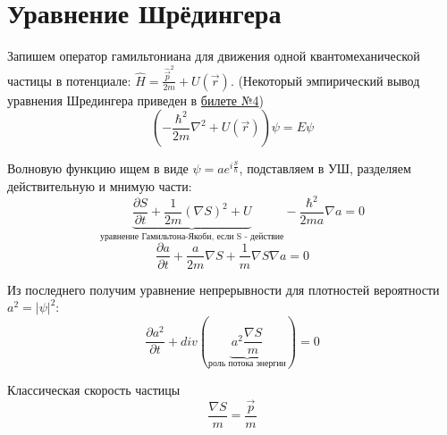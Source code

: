 \newpage
\chapter{Уравнение Шрёдингера}
\par Запишем оператор гамильтониана для движения одной квантомеханической частицы в потенциале: $\hat{H} =\frac{\hat{\vec{p}}^2}{2m}+U(\vec{r})$. (Некоторый эмпирический вывод уравнения Шредингера приведен в \hyperref[]{билете №4})
$$(-\frac{\hbar^2}{2m} \nabla^2+U(\vec{r}))\psi = E \psi $$
\par Волновую функцию ищем в виде $\psi = a e^{i \frac{S}{\hbar}}$, подставляем в УШ, разделяем действительную и мнимую части:
$$\underbrace{\frac{\partial S}{\partial t} +\frac{1}{2m}(\nabla S)^2+ U}_{\text{уравнение Гамильтона-Якоби, если S - действие}} - \frac{\hbar^2}{2ma}\nabla a =0$$
$$\frac{\partial a}{\partial t} +\frac{a}{2m}\nabla S+\frac{1}{m}\nabla S \nabla a =0$$
\par Из последнего получим уравнение непрерывности для плотностей вероятности $a^2 = |\psi|^2$:
$$ \frac{\partial a^2}{\partial t} + div (\underbrace{a^2 \frac{\nabla S}{m}}_{\text{роль потока энергии}}) = 0$$
\par Классическая скорость частицы 
$$\frac{\nabla S}{m} = \frac{\vec{p}}{m}$$